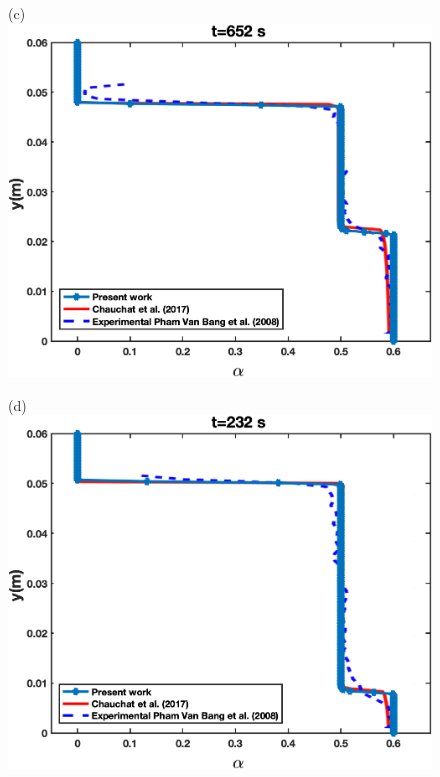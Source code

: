 \documentclass[review,3p,times,12pt]{elsarticle}
\begin{document}
\begin{minipage}[t]{0.5\textwidth}
\begin{figure}[H]
\begin{center}
(c)\includegraphics[scale = 0.45]{E2}
 \end{center}
\end{figure}
\end{minipage} \hfill 
\begin{minipage}[t]{0.5\textwidth}
\begin{figure}[H]
\begin{center}
(d)\includegraphics[scale = 0.45]{E1}
 \end{center}
\end{figure}
\end{minipage}\\
\end{document}
